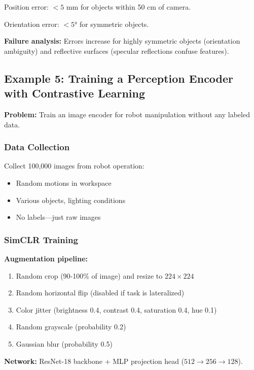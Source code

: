 Position error: $< 5$ mm for objects within 50 cm of camera.

Orientation error: $< 5°$ for symmetric objects.

\textbf{Failure analysis:} Errors increase for highly symmetric objects (orientation ambiguity) and reflective surfaces (specular reflections confuse features).


\subsection{Example 5: Training a Perception Encoder with Contrastive Learning}

\textbf{Problem:} Train an image encoder for robot manipulation without any labeled data.

\subsubsection{Data Collection}

Collect 100,000 images from robot operation:
\begin{itemize}
    \item Random motions in workspace
    \item Various objects, lighting conditions
    \item No labels---just raw images
\end{itemize}

\subsubsection{SimCLR Training}

\textbf{Augmentation pipeline:}
\begin{enumerate}
    \item Random crop (90-100\% of image) and resize to $224 \times 224$
    \item Random horizontal flip (disabled if task is lateralized)
    \item Color jitter (brightness 0.4, contrast 0.4, saturation 0.4, hue 0.1)
    \item Random grayscale (probability 0.2)
    \item Gaussian blur (probability 0.5)
\end{enumerate}

\textbf{Network:} ResNet-18 backbone + MLP projection head ($512 \rightarrow 256 \rightarrow 128$).

